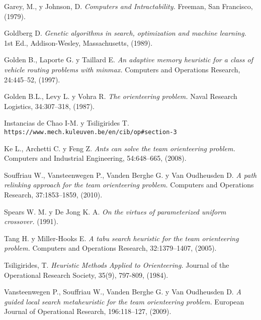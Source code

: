 \begin{thebibliography}{9}
Garey, M., y Johnson, D.
\textit{Computers and Intractability.}
Freeman, San Francisco, (1979).

Goldberg D.
\textit{Genetic algorithms in search, optimization and machine learning.}
1st Ed., Addison-Wesley, Massachusetts, (1989).

Golden B., Laporte G. y Taillard E.
\textit{An adaptive memory heuristic for a class of vehicle routing problems with minmax.}
Computers and Operations Research, 24:445–52, (1997).

Golden B.L., Levy L. y Vohra R. 
\textit{The orienteering problem.}
Naval Research Logistics, 34:307–318, (1987).

Instancias de Chao I-M. y Tsiligirides T.
\\\texttt{https://www.mech.kuleuven.be/en/cib/op\#section-3}

Ke L., Archetti C. y Feng Z.
\textit{Ants can solve the team orienteering problem.}
Computers and Industrial Engineering, 54:648–665, (2008).

Souffriau W., Vansteenwegen P., Vanden Berghe G. y Van Oudheusden D.
\textit{A path relinking approach for the team orienteering problem.}
Computers and Operations Research, 37:1853–1859, (2010).

Spears W. M. y De Jong K. A. 
\textit{On the virtues of parameterized uniform crossover.}
(1991).

Tang H. y Miller-Hooks E.
\textit{A tabu search heuristic for the team orienteering problem.}
Computers and Operations Research, 32:1379–1407, (2005).

Tsiligirides, T.
\textit{Heuristic Methods Applied to Orienteering.}
Journal of the Operational Research Society, 35(9), 797-809, (1984).

Vansteenwegen P., Souffriau W., Vanden Berghe G. y Van Oudheusden D.
\textit{A guided local search metaheuristic for the team orienteering problem.}
European Journal of Operational Research, 196:118–127, (2009).


\end{thebibliography}
